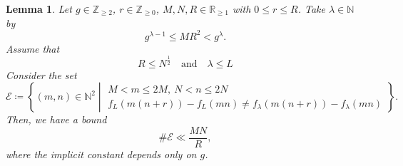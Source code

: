 \documentclass[hidelinks]{amsart}
\numberwithin{equation}{section}
\theoremstyle{plain}
\newtheorem{lemma}{Lemma}
\theoremstyle{definition}
\newcommand{\midmid}{\mathrel{}\middle|\mathrel{}}
\begin{document}
\begin{lemma}
\label{lem:truncation}
Let $g\in\mathbb{Z}_{\ge2}$, $r\in\mathbb{Z}_{\ge0}$, $M,N,R\in\mathbb{R}_{\ge1}$ with $0\le r\le R$.
Take $\lambda\in\mathbb{N}$ by
\begin{equation}
\label{lem:truncation:def_lambda}
g^{\lambda-1}\le MR^{2}<g^{\lambda}.
\end{equation}
Assume that
\begin{equation}
\label{lem:truncation:cond}
R\le N^{\frac{1}{2}}
\quad\text{and}\quad
\lambda\le L
\end{equation}
Consider the set
\begin{equation}
\label{lem:truncation:def:E}
\mathscr{E}
\coloneqq
\left\{
(m,n)\in\mathbb{N}^{2}
\midmid
\begin{gathered}
M<m\le 2M,\ N<n\le 2N\\
f_{L}(m(n+r))-f_{L}(mn)
\neq
f_{\lambda}(m(n+r))-f_{\lambda}(mn)
\end{gathered}
\right\}.
\end{equation}
Then, we have a bound
\begin{equation}
\label{lem:truncation:bound}
\#\mathscr{E}
\ll
\frac{MN}{R},
\end{equation}
where the implicit constant depends only on $g$.
\end{lemma}
\end{document}
